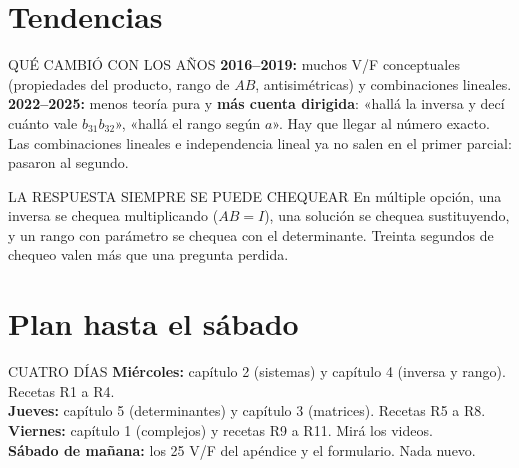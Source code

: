 \section{Tendencias}
\begin{memo}{QUÉ CAMBIÓ CON LOS AÑOS}
\textbf{2016--2019:} muchos V/F conceptuales (propiedades del producto, rango de $AB$, antisimétricas) y combinaciones lineales.\\
\textbf{2022--2025:} menos teoría pura y \textbf{más cuenta dirigida}: «hallá la inversa y decí cuánto vale $b_{31}b_{32}$», «hallá el rango según $a$». Hay que llegar al número exacto.\\
Las combinaciones lineales e independencia lineal ya no salen en el primer parcial: pasaron al segundo.
\end{memo}
\begin{trampa}{LA RESPUESTA SIEMPRE SE PUEDE CHEQUEAR}
En múltiple opción, una inversa se chequea multiplicando ($AB=I$), una solución se chequea sustituyendo, y un rango con parámetro se chequea con el determinante. Treinta segundos de chequeo valen más que una pregunta perdida.
\end{trampa}

\section{Plan hasta el sábado}
\begin{metodo}{CUATRO DÍAS}
\textbf{Miércoles:} capítulo 2 (sistemas) y capítulo 4 (inversa y rango). Recetas R1 a R4.\\
\textbf{Jueves:} capítulo 5 (determinantes) y capítulo 3 (matrices). Recetas R5 a R8.\\
\textbf{Viernes:} capítulo 1 (complejos) y recetas R9 a R11. Mirá los videos.\\
\textbf{Sábado de mañana:} los 25 V/F del apéndice y el formulario. Nada nuevo.
\end{metodo}
